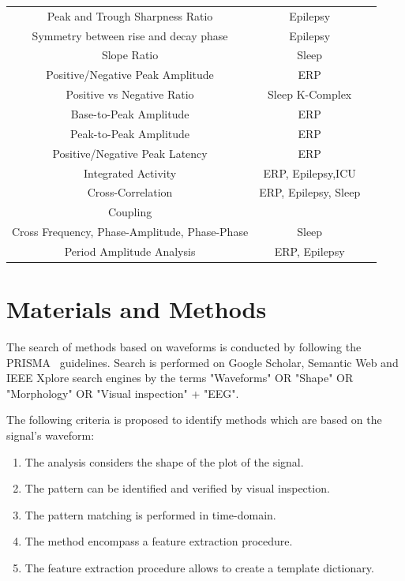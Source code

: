 \documentclass[brainsci,article,submit,moreauthors,pdftex,10pt,a4paper]{mdpi}
\begin{document}
\begin{table}[H]
\begin{tabular}{ccc}
Peak and Trough Sharpness Ratio     & Epilepsy &  \citep{Hartman2005,Sanei2007,Lawrence2010,Cole2017} \\
Symmetry between rise and decay phase     & Epilepsy &  \citep{Hartman2005,Cole2017} \\
Slope Ratio    & Sleep &  \citep{Subha2010} \\
Positive/Negative Peak Amplitude & ERP & \citep{Thakor2004,Hartman2005,Tatum2008,Mak2012,MullerPutz2015,Cole2017} \\
Positive vs Negative Ratio    & Sleep K-Complex &  \citep{EEGIntro} \\
Base-to-Peak Amplitude     & ERP  &  \citep{Cole2017} \\
Peak-to-Peak Amplitude     & ERP  &  \citep{Wulsin2011,Mak2012} \\
Positive/Negative Peak Latency                                 & ERP  & \citep{Mak2012}  \\
Integrated Activity               & ERP, Epilepsy,ICU & \citep{Wulsin2011,Uchida1999, Shah2015} \\
Cross-Correlation                & ERP, Epilepsy, Sleep & \citep{Cacioppo2007, Shah2015} \\
Coupling \\ Cross Frequency,  Phase-Amplitude, Phase-Phase     & Sleep & \citep{Cole2017} \\
Period Amplitude Analysis  & ERP, Epilepsy & \citep{Uchida1999,Cacioppo2007, Shah2015} \\
\bottomrule
\end{tabular}
\label{tab:methods}
\end{table}


\section{Materials and Methods}

The search of methods based on waveforms is conducted by following the PRISMA~\citep{Moher2009} guidelines.  Search is performed on Google Scholar, Semantic Web and IEEE Xplore search engines by the terms "Waveforms" OR "Shape" OR "Morphology" OR "Visual inspection" + "EEG".

The following criteria is proposed to identify methods which are based on the signal's waveform:

\begin{enumerate}
\item The analysis considers the shape of the plot of the signal.
\item The pattern can be identified and verified by visual inspection.
\item The pattern matching is performed in time-domain.
\item The method encompass a feature extraction procedure.
\item The feature extraction procedure allows to create a template dictionary.
\end{enumerate}
\end{document}
